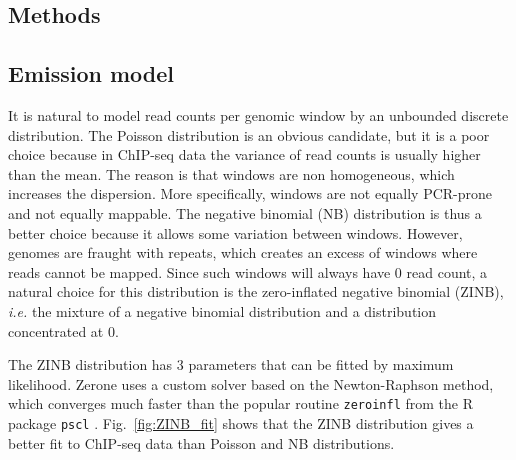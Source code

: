 \documentclass{bioinfo}
\begin{document}
\begin{methods}
\section{Methods}

\subsection{Emission model}
\label{sub:emissions}
It is natural to model read counts per genomic window by an unbounded
discrete distribution. The Poisson distribution is an obvious candidate,
but it is a poor choice because in ChIP-seq data the variance of read
counts is usually higher than the mean. The reason is that windows
are non homogeneous, which increases the dispersion. More specifically,
windows
are not equally PCR-prone and not equally mappable. The negative binomial
(NB) distribution is thus a better choice because it allows some variation
between windows. However, genomes are fraught with repeats, which creates
an excess of windows where reads cannot be mapped. Since such windows
will always have 0 read count, a natural choice for this distribution is
the zero-inflated negative binomial (ZINB), \textit{i.e.} the mixture of
a negative binomial distribution and a distribution concentrated at 0.

The ZINB distribution has 3 parameters that can be fitted by maximum
likelihood. Zerone uses a custom solver based on the Newton-Raphson
method, which converges much faster than the popular routine
\texttt{zeroinfl} \citep{psclb} from the R \citep{R} package \texttt{pscl}
\citep{pscla}.
Fig.~\ref{fig:ZINB_fit} shows that the ZINB distribution gives a better
fit to ChIP-seq data than Poisson and NB distributions.


\end{methods}
\end{document}
